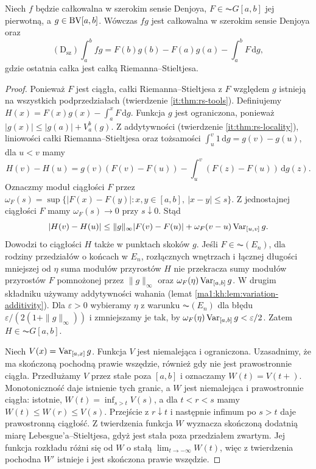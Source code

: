 \begin{twierdzenie}\label{ma1:kh:thm:wide-denjoy-multiplier}
Niech $f$ będzie całkowalna w szerokim sensie Denjoya, $F\in\AC G[a,b]$ jej pierwotną, a $g\in\mathrm{BV}[a,b]$. Wówczas $fg$ jest całkowalna w szerokim sensie Denjoya oraz
\[
 (\mathrm D_{\mathrm{sz}})\int_a^b fg
 =F(b)g(b)-F(a)g(a)-\int_a^b F\,\mathrm dg,
\]
gdzie ostatnia całka jest całką Riemanna--Stieltjesa.
\end{twierdzenie}
\begin{proof}
Ponieważ $F$ jest ciągła, całki Riemanna--Stieltjesa z $F$ względem $g$ istnieją na wszystkich podprzedziałach (twierdzenie \ref{it:thm:rs-tools}). Definiujemy
$H(x)=F(x)g(x)-\int_a^x F\,\mathrm dg$.
Funkcja $g$ jest ograniczona, ponieważ
$|g(x)|\le |g(a)|+V_a^b(g)$.
Z addytywności (twierdzenie \ref{it:thm:rs-locality}),
liniowości całki Riemanna--Stieltjesa oraz tożsamości
$\int_u^v 1\,\mathrm dg=g(v)-g(u)$, dla $u<v$ mamy
\[
 H(v)-H(u)=g(v)(F(v)-F(u))-\int_u^v(F(z)-F(u))\,\mathrm dg(z).
\]
Oznaczmy moduł ciągłości $F$ przez $\omega_F(s)=\sup\{|F(x)-F(y)|:x,y\in[a,b],\ |x-y|\le s\}$. Z jednostajnej ciągłości $F$ mamy $\omega_F(s)\to0$ przy $s\downarrow0$. Stąd
\[
 |H(v)-H(u)|\le \|g\|_\infty |F(v)-F(u)|
   +\omega_F(v-u)\operatorname{Var}_{[u,v]}g.
\]
Dowodzi to ciągłości $H$ także w punktach skoków $g$. Jeśli $F\in\AC(E_n)$, dla rodziny przedziałów o końcach w $E_n$, rozłącznych wnętrzach i łącznej długości mniejszej od $\eta$ suma modułów przyrostów $H$ nie przekracza sumy modułów przyrostów $F$ pomnożonej przez $\|g\|_\infty$ oraz $\omega_F(\eta)\operatorname{Var}_{[a,b]}g$. W drugim składniku używamy addytywności wahania (lemat \ref{ma1:kh:lem:variation-additivity}). Dla $\varepsilon>0$ wybieramy $\eta$ z warunku $\AC(E_n)$ dla błędu $\varepsilon/(2(1+\|g\|_\infty))$ i zmniejszamy je tak, by $\omega_F(\eta)\operatorname{Var}_{[a,b]}g<\varepsilon/2$. Zatem $H\in\AC G[a,b]$.

Niech $V(x)=\operatorname{Var}_{[a,x]}g$. Funkcja $V$ jest
niemalejąca i ograniczona. Uzasadnimy, że ma skończoną
pochodną prawie wszędzie, również gdy nie jest
prawostronnie ciągła. Przedłużamy $V$ przez stałe
poza $[a,b]$ i oznaczamy $W(t)=V(t+)$.
Monotoniczność daje istnienie tych granic, a $W$
jest niemalejąca i prawostronnie ciągła: istotnie,
$W(t)=\inf_{s>t}V(s)$, a dla $t<r<s$ mamy
$W(t)\le W(r)\le V(s)$. Przejście z $r\downarrow t$
i następnie infimum po $s>t$ daje prawostronną
ciągłość. Z twierdzenia 
funkcja $W$ wyznacza skończoną dodatnią miarę
Lebesgue'a--Stieltjesa, gdyż jest stała poza przedziałem
zwartym. Jej funkcja rozkładu różni się od $W$
o stałą $\lim_{t\to-\infty}W(t)$, więc z twierdzenia
 pochodna $W'$ istnieje
i jest skończona prawie wszędzie.


\end{proof}
